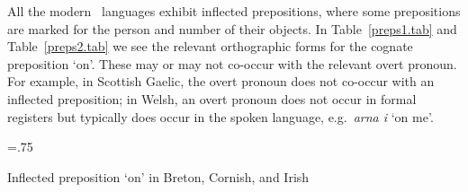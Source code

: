 \documentclass[output=paper,colorlinks,citecolor=brown]{langscibook}
\begin{document}
All the modern \ce\ languages exhibit inflected prepositions, where some prepositions are marked for the person and number of their objects. In Table~\ref{preps1.tab} and Table~\ref{preps2.tab} we see the relevant orthographic forms for the cognate preposition `on'. These may or may not co-occur with the relevant overt pronoun. For example, in Scottish Gaelic, the overt pronoun does not co-occur with an inflected preposition; in Welsh, an overt pronoun does not occur in formal registers but typically does occur in the spoken language, e.g.\ \emph{arna i} `on me'.

\begin{table}
\tabcolsep=.75\tabcolsep
\begin{floatrow}
{\caption{Inflected preposition `on' in Breton, Cornish, and Irish}
\label{preps1.tab}}
{\caption{Inflected preposition `on' in Manx, Scottish Gaelic, and Welsh}
\label{preps2.tab}}
\end{floatrow}
\end{table}
\end{document}
